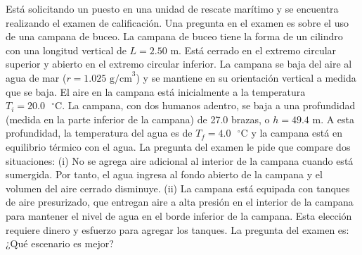 \item Está solicitando un puesto en una unidad de rescate marítimo y se encuentra realizando el examen de calificación. Una pregunta en el examen es sobre el uso de una campana de buceo. La campana de buceo tiene la forma de un cilindro con una longitud vertical de $L = 2.50\text{ m}$. Está cerrado en el extremo circular superior y abierto en el extremo circular inferior. La campana se baja del aire al agua de mar ($r = 1.025\text{ g/cm}^3$) y se mantiene en su orientación vertical a medida que se baja. El aire en la campana está inicialmente a la temperatura $T_i = 20.0\text{ }^\circ\text{C}$. La campana, con dos humanos adentro, se baja a una profundidad (medida en la parte inferior de la campana) de 27.0 brazas, o $h = 49.4\text{ m}$. A esta profundidad, la temperatura del agua es de $T_f = 4.0\text{ }^\circ\text{C}$ y la campana está en equilibrio térmico con el agua. La pregunta del examen le pide que compare dos situaciones: 
(i) No se agrega aire adicional al interior de la campana cuando está sumergida. Por tanto, el agua ingresa al fondo abierto de la campana y el volumen del aire cerrado disminuye. 
(ii) La campana está equipada con tanques de aire presurizado, que entregan aire a alta presión en el interior de la campana para mantener el nivel de agua en el borde inferior de la campana. Esta elección requiere dinero y esfuerzo para agregar los tanques. La pregunta del examen es: ¿Qué escenario es mejor?
